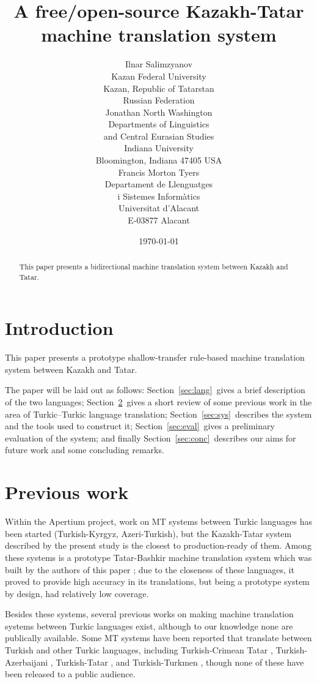 \documentclass[11pt]{article}
\title{A free/open-source Kazakh-Tatar machine translation system}
\author{Ilnar Salimzyanov\\
  Kazan Federal University\\
  Kazan, Republic of Tatarstan\\
  Russian Federation\\
  \email{ilnar.salimzyan@gmail.com}  \And
  Jonathan North Washington\\
  Departments of Linguistics\\
  and Central Eurasian Studies\\
  Indiana University\\
  Bloomington, Indiana 47405 USA\\
  \email{jonwashi@indiana.edu}  \And
  Francis Morton Tyers\\
  Departament de Llenguatges\\
  i Sistemes Informàtics\\
  Universitat d'Alacant\\
  E-03877 Alacant\\
  \email{ftyers@dlsi.ua.es}}
\date{\today}
\begin{document}
\maketitle
\begin{abstract}
This paper presents a bidirectional machine translation system between Kazakh and Tatar.
\end{abstract}

\section{Introduction}

This paper presents a prototype shallow-transfer rule-based machine translation
system between Kazakh and Tatar.

The paper will be laid out as follows: Section~\ref{sec:lang}\ gives a brief
description of the two languages; Section~\ref{sec:prev}\ gives a short review
of some previous work in the area of Turkic--Turkic language translation;
Section~\ref{sec:sys}\ describes the system and the tools used to construct it;
Section~\ref{sec:eval}\ gives a preliminary evaluation of the system; and
finally Section~\ref{sec:conc}\ describes our aims for future work and some
concluding remarks.

\section{Previous work}
\label{sec:prev}

Within the Apertium project, work on MT systems between Turkic languages has been started (Turkish-Kyrgyz, Azeri-Turkish), but the Kazakh-Tatar system described by the present study is the closest to production-ready of them.  Among these systems is a prototype Tatar-Bashkir machine translation system which was built by the authors of this paper \citep{tyerswashingtonsalimzyanbattalov12}; due to the closeness of these languages, it proved to provide high accuracy in its translations, but being a prototype system by design, had relatively low coverage.

Besides these systems, several previous works on making machine translation systems between Turkic languages exist, although to our knowledge none are publically available.
Some MT systems have been reported that translate between Turkish and other Turkic languages, including Turkish-Crimean Tatar \citep{altintas01},
Turkish-Azerbaijani \citep{hamzaoglu93}, Turkish-Tatar \citep{suleymanov08}, and
Turkish-Turkmen \citep{tantug07}, though none of these have been released to a public audience.
\end{document}

